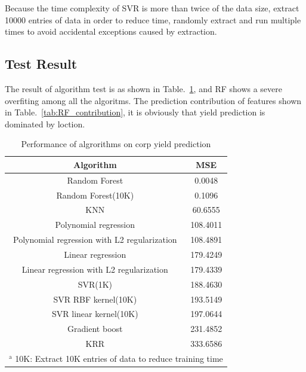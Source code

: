 \documentclass[conference]{IEEEtran}
\begin{document}
Because the time complexity of SVR is more than twice of the data size\cite{clarke2005analysis}, extract 10000 entries of data in order to reduce time, randomly extract and run multiple times to avoid accidental exceptions caused by extraction.



\subsection{Test Result}
The result of algorithm test is as shown in Table.~\ref{tab:result}, and RF shows a severe overfiting among all the algoritms. The prediction contribution of features shown in Table.~\ref{tab:RF_contribution}, it is obviously that yield prediction is dominated by loction.

\begin{table}[htbp]
  \caption{Performance of algrorithms on corp yield prediction}
  \begin{center}
  \begin{tabular}{|c|c|}
  \hline
  Algorithm                                    & MSE      \\
  \hline
  Random Forest                                & 0.0048   \\
  Random Forest(10K)                           & 0.1096   \\
  KNN                                          & 60.6555  \\
  Polynomial regression                        & 108.4011 \\
  Polynomial regression with L2 regularization & 108.4891 \\
  Linear regression                            & 179.4249 \\
  Linear regression with L2 regularization     & 179.4339 \\
  SVR(1K)                                      & 188.4630 \\
  SVR RBF kernel(10K)                          & 193.5149 \\
  SVR linear kernel(10K)                       & 197.0644 \\
  Gradient boost                               & 231.4852 \\
  KRR                                          & 333.6586 \\
  \hline
  \multicolumn{2}{l}{$^{\mathrm{a}}$ 10K: Extract 10K entries of data to reduce training time} \\
  \end{tabular}
  \label{tab:result}
  \end{center}
\end{table}
\end{document}
